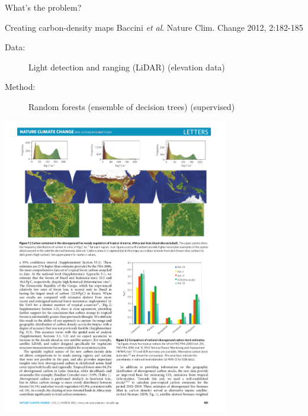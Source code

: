 \documentclass[pdf]{beamer}
\begin{document}
\begin{frame}{What's the problem?}
\begin{exampleblock}{Creating carbon-density maps \vskip-1mm{\tiny Baccini \textit{et al}. Nature Clim. Change 2012, 2:182-185}}
\begin{description}
	\item[Data:] Light detection and ranging (LiDAR) (elevation data)
	\item[Method:] Random forests (ensemble of decision trees) (supervised)
\end{description}
\begin{center}
	\includegraphics[width=0.74\textwidth]{baccini.pdf}
\end{center}
\end{exampleblock}
\end{frame}
\end{document}
